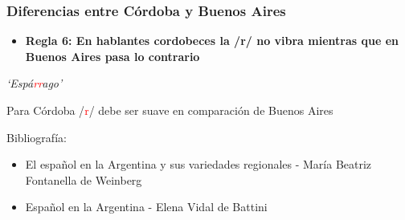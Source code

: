\documentclass[mathserif]{beamer}%
\begin{document}
\begin{frame}[noframenumbering]
	\frametitle{Diferencias entre Córdoba y Buenos Aires}
	\begin{itemize}\itemsep=3ex
		\item \textbf{Regla 6: En hablantes cordobeces la /r/ no vibra mientras que en Buenos Aires pasa lo contrario} \\ 
	\end{itemize}	
	
	\begin{center}
		\textit{`Espá\textcolor{red}{rr}ago'}
	\end{center} 
		
	\begin{center}
		Para Córdoba /\textcolor{red}{r}/ debe ser suave en comparación de Buenos Aires
	\end{center}
	
	{\tiny Bibliografía:
		\begin{itemize}
			\item El español en la Argentina y sus variedades regionales - María Beatriz Fontanella de Weinberg
			\item Español en la Argentina - Elena Vidal de Battini
		\end{itemize}}	
\end{frame}
\end{document}
